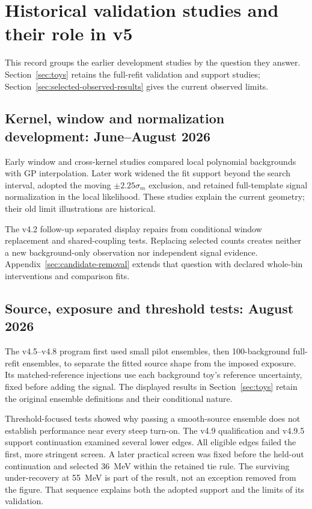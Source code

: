 \section{Historical validation studies and their role in v5}
\label{sec:v5-historical-validation}

This record groups the earlier development studies by the question they answer.
Section~\ref{sec:toys} retains the full-refit validation and support studies;
Section~\ref{sec:selected-observed-results} gives the current observed limits.

\subsection{Kernel, window and normalization development: June--August 2026}
Early window and cross-kernel studies compared local polynomial backgrounds
with GP interpolation. Later work widened the fit support beyond the search
interval, adopted the moving $\pm2.25\sigma_m$ exclusion, and retained
full-template signal normalization in the local likelihood. These studies
explain the current geometry; their old limit illustrations are historical.

The v4.2 follow-up separated display repairs from conditional window
replacement and shared-coupling tests. Replacing selected counts creates
neither a new background-only observation nor independent signal evidence.
Appendix~\ref{sec:candidate-removal} extends that question with declared
whole-bin interventions and comparison fits.

\subsection{Source, exposure and threshold tests: August 2026}
The v4.5--v4.8 program first used small pilot ensembles, then 100-background
full-refit ensembles, to separate the fitted source shape from the imposed
exposure. Its matched-reference injections use each background toy's reference
uncertainty, fixed before adding the signal. The displayed results in Section~\ref{sec:toys}
retain the original ensemble definitions and their conditional nature.

Threshold-focused tests showed why passing a smooth-source ensemble does not
establish performance near every steep turn-on. The v4.9 qualification and
v4.9.5 support continuation examined several lower edges. All eligible edges
failed the first, more stringent screen. A later practical screen was fixed
before the held-out continuation and selected 36~MeV within the retained tie
rule. The surviving under-recovery at 55~MeV is part of the result, not an
exception removed from the figure. That sequence explains both the adopted
support and the limits of its validation.


